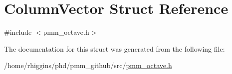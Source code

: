 \hypertarget{structColumnVector}{\section{Column\-Vector Struct Reference}
\label{structColumnVector}
}


{\ttfamily \#include $<$pmm\-\_\-octave.\-h$>$}



The documentation for this struct was generated from the following file\-:\begin{DoxyCompactItemize}
\item 
/home/rhiggins/phd/pmm\-\_\-github/src/\hyperlink{pmm__octave_8h}{pmm\-\_\-octave.\-h}\end{DoxyCompactItemize}
